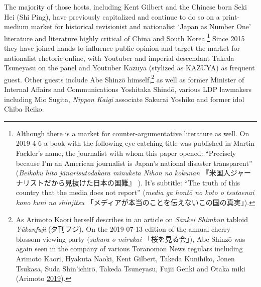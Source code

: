 \documentclass[10pt,british,A4paper,,openany]{memoir}
\begin{document}
The majority of those hosts, including Kent Gilbert and the Chinese born
Seki Hei (Shi Ping), have previously capitalized and continue to do so
on a print-medium market for historical revisionist and nationalist
`Japan as Number One' literature and literature highly critical of China
and South Korea.\footnote{Although there is a market for
  counter-argumentative literature as well. On 2019-4-6 a book with the
  following eye-catching title was published in Martin Fackler's name,
  the journalist with whom this paper opened: ``Precisely because I'm an
  American journalist is Japan's national disaster transparent''
  (\emph{Beikoku hito jānarisutodakara minuketa Nihon no kokunan}
  『米国人ジャーナリストだから見抜けた日本の国難』 ). It's subtitle:
  ``The truth of this country that the media does not report''
  (\emph{media ga hontō no koto o tsutaenai kono kuni no shinjitsu}
  「メディアが本当のことを伝えないこの国の真実」).} Since 2015 they have
joined hands to influence public opinion and target the market for
nationalist rhetoric online, with Youtuber and imperial descendant
Takeda Tsuneyasu on the panel and Youtuber Kazuya (stylized as KAZUYA)
as frequent guest. Other guests include Abe Shinzō himself,\footnote{As
  Arimoto Kaori herself describes in an article on \emph{Sankei Shimbun}
  tabloid \emph{Yūkanfuji} (夕刊フジ), On the 2019-07-13 edition of the
  annual cherry blossom viewing party (\emph{sakura o mirukai}
  「桜を見る会」), Abe Shinzō was again seen in the company of various
  Toranomon News regulars including Arimoto Kaori, Hyakuta Naoki, Kent
  Gilbert, Takeda Kunihiko, Jōnen Tsukasa, Suda Shin'ichirō, Takeda
  Tsuneyasu, Fujii Genki and Ōtaka miki (Arimoto
  \protect\hyperlink{ref-arimoto_eng._2019}{2019}).} as well as former
Minister of Internal Affairs and Communications Yoshitaka Shindō,
various LDP lawmakers including Mio Sugita, \emph{Nippon Kaigi}
associate Sakurai Yoshiko and former idol Chiba Reiko.
\end{document}
